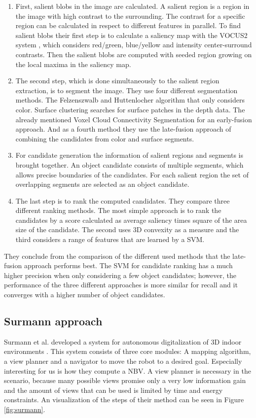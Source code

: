 \documentclass[a4paper,11pt,english]{article}
\begin{document}
\begin{enumerate}
	\item First, salient blobs in the image are calculated.
	A salient region is a region in the image with high contrast to the surrounding.
	The contrast for a specific region can be calculated in respect to different features in parallel.
	To find salient blobs their first step is to calculate a saliency map with the VOCUS2 system \cite{frintrop2015traditional}, which considers red/green, blue/yellow and intensity center-surround contrasts.
	Then the salient blobs are computed with seeded region growing on the local maxima in the saliency map.
	\item The second step, which is done simultaneously to the salient region extraction, is to segment the image.
	They use four different segmentation methods. The Felzenszwalb and Huttenlocher algorithm \cite{felzenszwalb2004efficient} that only considers color. Surface clustering searches for surface patches in the depth data. The already mentioned Voxel Cloud Connectivity Segmentation for an early-fusion approach. And as a fourth method they use the late-fusion approach of combining the candidates from color and surface segments.
	\item For candidate generation the information of salient regions and segments is brought together.
	An object candidate consists of multiple segments, which allows precise boundaries of the candidates.
	For each salient region the set of overlapping segments are selected as an object candidate.
	\item The last step is to rank the computed candidates. They compare three different ranking methods.
	The most simple approach is to rank the candidates by a score calculated as average saliency times square of the area size of the candidate.
	The second uses 3D convexity as a measure and the third considers a range of features that are learned by a SVM.
\end{enumerate}

They conclude from the comparison of the different used methods that the late-fusion approach performs best.
The SVM for candidate ranking has a much higher precision when only considering a few object candidates; however, the performance of the three different approaches is more similar for recall and it converges with a higher number of object candidates.

\subsection{Surmann approach}
\label{background:surmann}
Surmann et al. developed a system for autonomous digitalization of 3D indoor environments \cite{surmann2003autonomous}.
This system consists of three core modules: A mapping algorithm, a view planner and a navigator to move the robot to a desired goal.
Especially interesting for us is how they compute a NBV.
A view planner is necessary in the  scenario, because many possible views promise only a very low information gain and the amount of views that can be used is limited by time and energy constraints.
An visualization of the steps of their method can be seen in Figure \ref{fig:surmann}.
\end{document}
